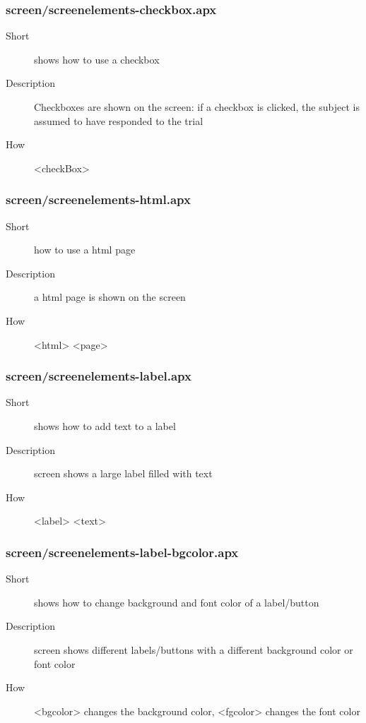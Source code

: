 \subsubsection{screen/screenelements-checkbox.apx}
\begin{description}
\item[Short] 
 shows how to use a checkbox
\item[Description] 
 Checkboxes are shown on the screen: if a checkbox is clicked, the subject is assumed to have responded to the trial
\item[How] 
 \textless{}checkBox\textgreater{}
\end{description}

\subsubsection{screen/screenelements-html.apx}
\begin{description}
\item[Short] 
 how to use a html page
\item[Description] 
 a html page is shown on the screen
\item[How] 
 \textless{}html\textgreater{} \textless{}page\textgreater{}
\end{description}

\subsubsection{screen/screenelements-label.apx}
\begin{description}
\item[Short] 
 shows how to add text to a label
\item[Description] 
 screen shows a large label filled with text
\item[How] 
 \textless{}label\textgreater{} \textless{}text\textgreater{}
\end{description}

\subsubsection{screen/screenelements-label-bgcolor.apx}
\begin{description}
\item[Short] 
 shows how to change background and font color of a label/button
\item[Description] 
 screen shows different labels/buttons with a different background color or font color
\item[How] 
 \textless{}bgcolor\textgreater{} changes the background color, \textless{}fgcolor\textgreater{} changes the font color
\end{description}

